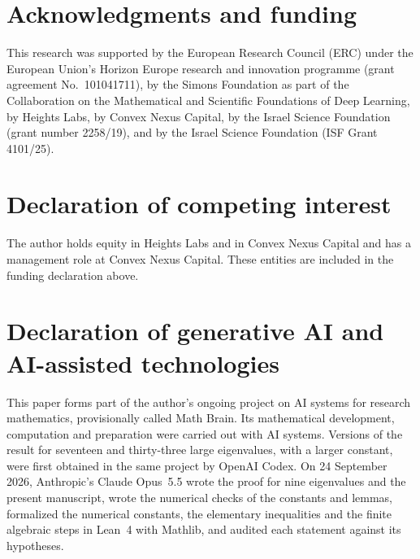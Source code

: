 \documentclass[11pt]{amsart}
\numberwithin{equation}{section}
\theoremstyle{definition}
\theoremstyle{remark}
\newcommand{\1}{\mathbf 1}
\begin{document}
\section*{Acknowledgments and funding}

This research was supported by the European Research Council (ERC) under the European Union's Horizon Europe research and innovation programme (grant agreement No.~101041711), by the Simons Foundation as part of the Collaboration on the Mathematical and Scientific Foundations of Deep Learning, by Heights Labs, by Convex Nexus Capital, by the Israel Science Foundation (grant number 2258/19), and by the Israel Science Foundation (ISF Grant 4101/25).

\section*{Declaration of competing interest}

The author holds equity in Heights Labs and in Convex Nexus Capital and has a management role at Convex Nexus Capital. These entities are included in the funding declaration above.

\section*{Declaration of generative AI and AI-assisted technologies}

This paper forms part of the author's ongoing project on AI systems for research mathematics, provisionally called Math Brain. Its mathematical development, computation and preparation were carried out with AI systems. Versions of the result for seventeen and thirty-three large eigenvalues, with a larger constant, were first obtained in the same project by OpenAI Codex. On 24 September 2026, Anthropic's Claude Opus~5.5 wrote the proof for nine eigenvalues and the present manuscript, wrote the numerical checks of the constants and lemmas, formalized the numerical constants, the elementary inequalities and the finite algebraic steps in Lean~4 with Mathlib, and audited each statement against its hypotheses.
\end{document}
